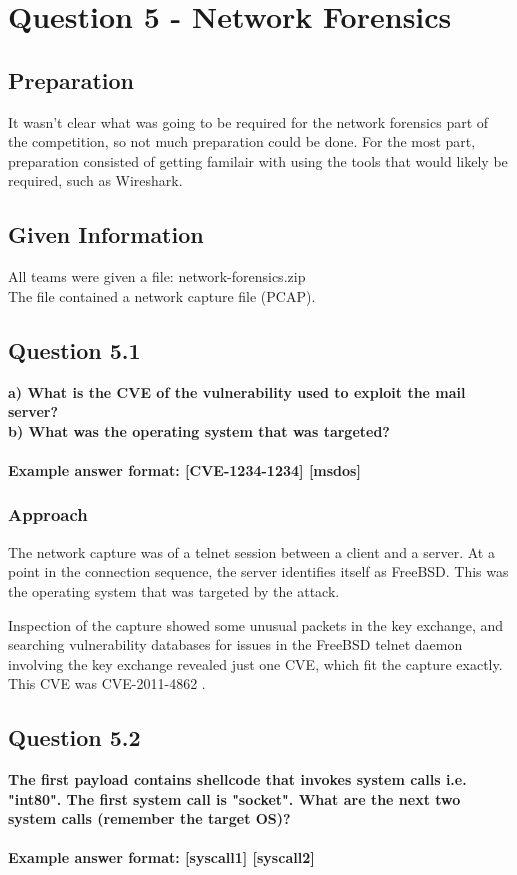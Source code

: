 \chapter{Question 5 - Network Forensics}

\section{Preparation}
It wasn't clear what was going to be required for the network forensics part
of the competition, so not much preparation could be done. For the most part,
preparation consisted of getting familair with using the tools that would
likely be required, such as Wireshark.

\section{Given Information}
All teams were given a file: network-forensics.zip\\
The file contained a network capture file (PCAP).

\section{Question 5.1}
\textbf{a) What is the CVE of the vulnerability used to exploit the mail server?
\\b) What was the operating system that was targeted?
\\\\
Example answer format: [CVE-1234-1234] [msdos]}
\subsection{Approach}
The network capture was of a telnet session between a client and a server. At
a point in the connection sequence, the server identifies itself as FreeBSD.
This was the operating system that was targeted by the attack.

Inspection of the capture showed some unusual packets in the key exchange,
and searching vulnerability databases for issues in the FreeBSD telnet
daemon involving the key exchange revealed just one CVE, which fit the
capture exactly. This CVE was CVE-2011-4862 \cite{CVE-2011-4862}.

\section{Question 5.2}
\textbf{The first payload contains shellcode that invokes system calls i.e.
"int80". The first system call is "socket". What are the next two system calls
(remember the target OS)?
\\\\
Example answer format: [syscall1] [syscall2]}

